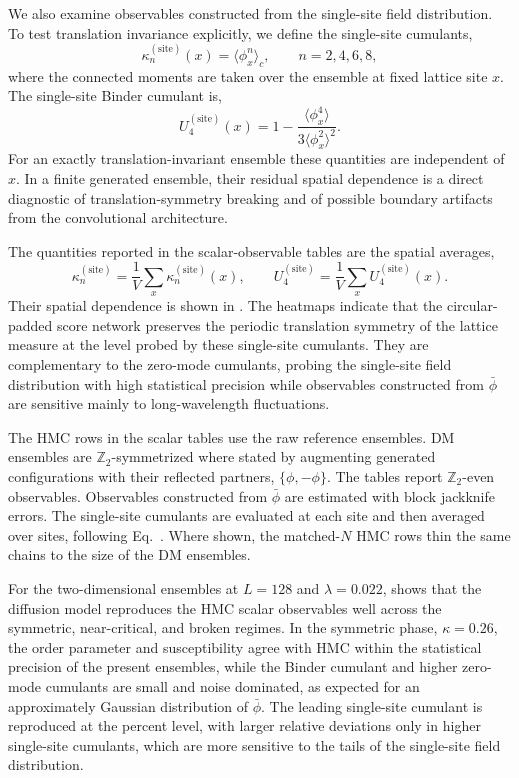 \documentclass[reprint,twocolumn,superscriptaddress,preprintnumbers,amsmath,amssymb,aps,prd,floatfix]{revtex4-2}
\def\Eq#1{Eq.~\labelcref{#1}} \def\Eqs#1{Eqs.~\labelcref{#1}}
\begin{document}
We also examine observables constructed from the single-site field distribution. To test translation invariance explicitly, we define the single-site cumulants,
\begin{equation}
  \kappa^{(\mathrm{site})}_n(x)
  =
  \langle \phi_x^n\rangle_c,
  \qquad n=2,4,6,8 ,
  \label{eq:site_cumulants_x}
\end{equation}
where the connected moments are taken over the ensemble at fixed lattice site $x$. The single-site Binder cumulant is,
\begin{equation}
  U^{(\mathrm{site})}_4(x)
  =
  1 -
  \frac{\langle \phi_x^4\rangle}
       {3\langle \phi_x^2\rangle^2}.
  \label{eq:site_binder_x}
\end{equation}
For an exactly translation-invariant ensemble these quantities are independent of $x$. In a finite generated ensemble, their residual spatial dependence is a direct diagnostic of translation-symmetry breaking and of possible boundary artifacts from the convolutional architecture.

The quantities reported in the scalar-observable tables are the spatial averages,
\begin{equation}
  \kappa^{(\mathrm{site})}_n
  =
  \frac{1}{V}\sum_x \kappa^{(\mathrm{site})}_n(x),
  \qquad
  U^{(\mathrm{site})}_4
  =
  \frac{1}{V}\sum_x U^{(\mathrm{site})}_4(x).
  \label{eq:site_cumulants_avg}
\end{equation}
Their spatial dependence is shown in . The heatmaps indicate that the circular-padded score network preserves the periodic translation symmetry of the lattice measure at the level probed by these single-site cumulants. They are complementary to the zero-mode cumulants, probing the single-site field distribution with high statistical precision while observables constructed from $\bar\phi$ are sensitive mainly to long-wavelength fluctuations.

The HMC rows in the scalar tables use the raw reference ensembles. DM ensembles are $\mathbb{Z}_2$-symmetrized where stated by augmenting generated configurations with their reflected partners, $\{\phi,-\phi\}$. The tables report $\mathbb{Z}_2$-even observables. Observables constructed from $\bar\phi$ are estimated with block jackknife errors. The single-site cumulants are evaluated at each site and then averaged over sites, following \Eq{eq:site_cumulants_avg}. Where shown, the matched-$N$ HMC rows thin the same chains to the size of the DM ensembles.

For the two-dimensional ensembles at $L=128$ and $\lambda=0.022$,  shows that the diffusion model reproduces the HMC scalar observables well across the symmetric, near-critical, and broken regimes. In the symmetric phase, $\kappa=0.26$, the order parameter and susceptibility agree with HMC within the statistical precision of the present ensembles, while the Binder cumulant and higher zero-mode cumulants are small and noise dominated, as expected for an approximately Gaussian distribution of $\bar\phi$. The leading single-site cumulant is reproduced at the percent level, with larger relative deviations only in higher single-site cumulants, which are more sensitive to the tails of the single-site field distribution.
\end{document}
